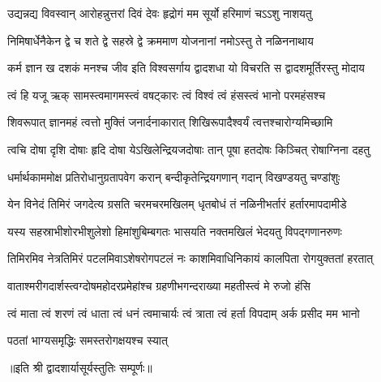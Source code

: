 

\twolineshloka
{उद्यन्नद्य विवस्वान् आरोहन्नुत्तरां दिवं देवः}
{हृद्रोगं मम सूर्यो हरिमाणं चऽऽशु नाशयतु}

\twolineshloka
{निमिषार्धेनैकेन द्वे च शते द्वे सहस्रे द्वे}
{क्रममाण योजनानां नमोऽस्तु ते नळिननाथाय}

\twolineshloka
{कर्म ज्ञान ख दशकं मनश्च जीव इति विश्वसर्गाय}
{द्वादशधा यो विचरति स द्वादशमूर्तिरस्तु मोदाय}

\twolineshloka
{त्वं हि यजू ऋक् सामस्त्वमागमस्त्वं वषट्कारः}
{त्वं विश्वं त्वं हंसस्त्वं भानो परमहंसश्च}

\twolineshloka
{शिवरूपात् ज्ञानमहं त्वत्तो मुक्तिं जनार्दनाकारात्}
{शिखिरूपादैश्वर्यं त्वत्तश्चारोग्यमिच्छामि}

\twolineshloka
{त्वचि दोषा दृशि दोषाः हृदि दोषा येऽखिलेन्द्रियजदोषाः}
{तान् पूषा हतदोषः किञ्चित् रोषाग्निना दहतु}

\twolineshloka
{धर्मार्थकाममोक्ष प्रतिरोधानुग्रतापवेग करान्}
{बन्दीकृतेन्द्रियगणान् गदान् विखण्डयतु चण्डांशुः}

\twolineshloka
{येन विनेदं तिमिरं जगदेत्य ग्रसति चरमचरमखिलम्}
{धृतबोधं तं नळिनीभर्तारं हर्तारमापदामीडे}

\twolineshloka
{यस्य सहस्राभीशोरभीशुलेशो हिमांशुबिम्बगतः}
{भासयति नक्तमखिलं भेदयतु विपद्गणानरुणः}

\twolineshloka
{तिमिरमिव नेत्रतिमिरं पटलमिवाऽशेषरोगपटलं नः}
{काशमिवाधिनिकायं कालपिता रोगयुक्ततां हरतात्}

\twolineshloka
{वाताश्मरीगदार्शस्त्वग्दोषमहोदरप्रमेहांश्च}
{ग्रहणीभगन्दराख्या महतीस्त्वं मे रुजो हंसि}

\twolineshloka
{त्वं माता त्वं शरणं त्वं धाता त्वं धनं त्वमाचार्यः}
{त्वं त्राता त्वं हर्ता विपदाम् अर्क प्रसीद मम भानो}

{पठतां भाग्यसमृद्धिः समस्तरोगक्षयश्च स्यात्}

॥इति श्री द्वादशार्यासूर्यस्तुतिः सम्पूर्णः॥